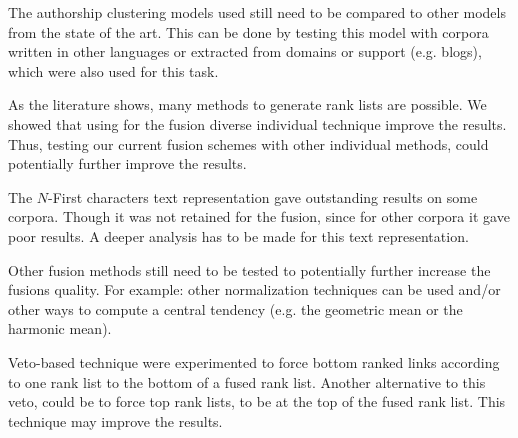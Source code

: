 The authorship clustering models used still need to be compared to other models from the state of the art.
This can be done by testing this model with corpora written in other languages or extracted from domains or support (e.g. blogs), which were also used for this task.

As the literature shows, many methods to generate rank lists are possible.
We showed that using for the fusion diverse individual technique improve the results.
Thus, testing our current fusion schemes with other individual methods, could potentially further improve the results.

The $N$-First characters text representation gave outstanding results on some corpora.
Though it was not retained for the fusion, since for other corpora it gave poor results.
A deeper analysis has to be made for this text representation.

Other fusion methods still need to be tested to potentially further increase the fusions quality.
For example: other normalization techniques can be used and/or other ways to compute a central tendency (e.g. the geometric mean or the harmonic mean).

Veto-based technique were experimented to force bottom ranked links according to one rank list to the bottom of a fused rank list.
Another alternative to this veto, could be to force top rank lists, to be at the top of the fused rank list.
This technique may improve the results.
